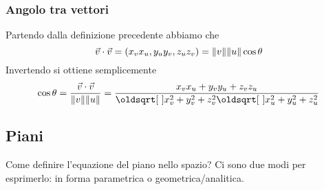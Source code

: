 \subsubsection{Angolo tra vettori}
\begin{center}
\end{center}
Partendo dalla definizione precedente abbiamo che
\begin{equation*}
  \vec{v}\cdot\vec{v}=(x_v x_u,y_u y_v,z_u z_v)=\lVert v\rVert\lVert u\rVert\cos\theta
\end{equation*}
Invertendo si ottiene semplicemente
\begin{equation*}
  \cos\theta=\frac{\vec{v}\cdot\vec{v}}{\norm{v}\norm{u}}=
  \frac{x_v x_u+y_v y_u+z_v z_u}{\sqrt{x_v^2+y_v^2+z_v^2}\sqrt{x_u^2+y_u^2+z_u^2}}
\end{equation*}

\subsection{Piani}
Come definire l'equazione del piano nello spazio? Ci sono due modi per esprimerlo: in forma 
parametrica o geometrica/analitica.
